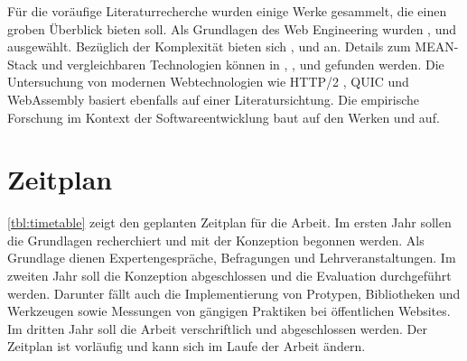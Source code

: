 Für die voräufige Literaturrecherche wurden einige Werke gesammelt, die einen groben Überblick bieten soll.
Als Grundlagen des Web Engineering wurden \cite{Pressman2000What}, \cite{Murugesan1999Web} und \cite{murugesan2001web} ausgewählt.
Bezüglich der Komplexität bieten sich \cite{cheng2006method}, \cite{johannsen2018progressive} und \cite{zagane2019evaluating} an.
Details zum MEAN-Stack und vergleichbaren Technologien können in \cite{dunka2018simplifying}, \cite{aggarwal2018comparative}, \cite{gomes2020teaching} und \cite{shabu2023development} gefunden werden.
Die Untersuchung von modernen Webtechnologien wie HTTP/2 \cite{zimmermann2017http,zimmermann2017qoe}, QUIC \cite{wolsing2019performance} und WebAssembly \cite{haas2017bringing,jangda2019not} basiert ebenfalls auf einer Literatursichtung.
Die empirische Forschung im Kontext der Softwareentwicklung baut auf den Werken \cite{wohlin2012experimentation} und \cite{felderer2020contemporary} auf.

\section*{Zeitplan}\label{sec:zeitplan}

\autoref{tbl:timetable} zeigt den geplanten Zeitplan für die Arbeit.
Im ersten Jahr sollen die Grundlagen recherchiert und mit der Konzeption begonnen werden.
Als Grundlage dienen Expertengespräche, Befragungen und Lehrveranstaltungen.
Im zweiten Jahr soll die Konzeption abgeschlossen und die Evaluation durchgeführt werden.
Darunter fällt auch die Implementierung von Protypen, Bibliotheken und Werkzeugen sowie Messungen von gängigen Praktiken bei öffentlichen Websites.
Im dritten Jahr soll die Arbeit verschriftlich und abgeschlossen werden.
Der Zeitplan ist vorläufig und kann sich im Laufe der Arbeit ändern.

